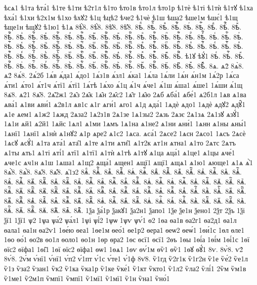 {ѣсѧ1
ѣ1та
ѣта́1
ѣ1те
ѣ1ти
ѣ2т1л
ѣ1то
ѣто1в
ѣто1л
ѣто1р
ѣ1тѐ
ѣ1ті
ѣ1тѝ
ѣ1тꙋ
ѣ1ха
ѣха́1
ѣ1хи
ѣ2х1м
ѣ1хо
ѣхꙋ2
ѣ1ц
ѣцѣ2
ѣче2
ѣ1чѐ
ѣ1ш
ѣша2
ѣше1м
ѣшє́1
ѣ1щ
ѣще1н
ѣщꙋ2
ѣ1ю1
ѣ1ѧ
8ѣ҆̀8.
8ѣ҆́8.
8ѣ҆̈8.
8ѣ҆̑8.
8ѣⷠ.
8ѣⷠ҇.
8ѣⷡ.
8ѣⷡ҇.
8ѣⷢ.
8ѣⷢ҇.
8ѣⷣ.
8ѣⷣ҇.
8ѣⷤ.
8ѣⷤ҇.
8ѣⷥ.
8ѣⷥ҇.
8ѣⷦ.
8ѣⷦ҇.
8ѣⷧ.
8ѣⷧ҇.
8ѣⷨ.
8ѣⷨ҇.
8ѣⷩ.
8ѣⷩ҇.
8ѣⷪ.
8ѣⷪ҇.
8ѣⷫ.
8ѣⷫ҇.
8ѣⷬ.
8ѣⷬ҇.
8ѣⷭ.
8ѣⷭ҇.
8ѣⷮ.
8ѣⷮ҇.
8ѣⷯ.
8ѣⷯ҇.
8ѣⷰ.
8ѣⷰ҇.
8ѣⷱ.
8ѣⷱ҇.
8ѣⷲ.
8ѣⷲ҇.
8ѣⷳ.
8ѣⷳ҇.
8ѣⷴ.
8ѣⷴ҇.
8ѣⷵ.
8ѣⷵ҇.
8ѣⷶ.
8ѣⷶ҇.
8ѣⷷ.
8ѣⷷ҇.
8ѣⷸ.
8ѣⷸ҇.
8ѣⷹ.
8ѣⷹ҇.
8ѣⷺ.
8ѣⷺ҇.
8ѣⷻ.
8ѣⷻ҇.
8ѣⷼ.
8ѣⷼ҇.
8ѣⷽ.
8ѣⷽ҇.
8ѣⷾ.
8ѣⷾ҇.
8ѣⷿ.
8ѣⷿ҇.
ѣ1ꙋ
ѣꙋ́1
8ѣꙴ.
8ѣꙴ҇.
8ѣꙵ.
8ѣꙵ҇.
8ѣꙶ.
8ѣꙶ҇.
8ѣꙷ.
8ѣꙷ҇.
8ѣꙸ.
8ѣꙸ҇.
8ѣꙹ.
8ѣꙹ҇.
8ѣꙺ.
8ѣꙺ҇.
8ѣꙻ.
8ѣꙻ҇.
8ѣ꙼.
8ѣ꙼҇.
8ѣ꙽.
8ѣ꙽҇.
8ѧ.
ѧ2̀
8ѧ̀8.
ѧ2́
8ѧ́8.
2ѧ́2б
1ѧ́в
ѧ́да1
ѧ́до1
1ѧ́з1в
ѧ́зл1
ѧ́ка1
1ѧ́ла
1ѧ́ли
1ѧ́н
ѧ́н1м
1ѧ́2р
1ѧ́са
ѧ́ти1
ѧ́то1
ѧ́т1ч
ѧ́тї1
ѧ́тї1
1ѧ́тѣ
1ѧ́хо
ѧ́1ц
ѧ́1ч
ѧ́че1
ѧ́1ш
ѧ́ша1
ѧ́ше1
1ѧ́ши
ѧ́1щ
8ѧ̈8.
ѧ2̑1
8ѧ̑8.
2ѧ̑2ж1
2ѧ̑з
2ѧ̑к
1ѧ̑н
2ѧ̑с2
1ѧ̑т
1ѧ̑ю
2ѧб
ѧба́1
ѧбе́1
ѧ2б1л
1ѧв
ѧ1ва
ѧва́1
ѧ1ви
ѧви́1
ѧ2в1л
ѧв1с
ѧ1г
ѧги́1
ѧго1
ѧ1д
ѧда́1
1ѧдѐ
ѧдо1
1ѧдѐ
ѧдꙋ2
ѧдꙋ̑1
ѧ1е
ѧем1
ѧ1ж2
1ѧжд
2ѧза2
1ѧ2з1в
2ѧ1зе
1ѧ1зы2
2ѧзь
2ѧзє
2ѧ1зѧ
2ѧ1зꙋ
ѧзꙋ́1
1ѧ1и
ѧй1
ѧ2й1
1ѧйс
1ѧл1
ѧ1ми
1ѧмъ
1ѧ1на
ѧ1не2
ѧ1ни
ѧни́1
1ѧнн
ѧ1ны
ѧны́1
1ѧнї1
1ѧнї1
ѧ1нѝ
ѧ1нꙋ2
ѧ1р
ѧре2
ѧ1с2
1ѧса.
ѧса́1
2ѧсе2
1ѧсн
2ѧсо1
1ѧсъ
2ѧсѐ
1ѧсꙋ
ѧсꙋ́1
ѧ1та
ѧта́1
ѧта̑1
ѧ1те
ѧ1ти
ѧти̑1
ѧ1т2к
ѧт1н
ѧтна1
ѧ1то
2ѧтс
2ѧтъ
ѧ1ты
ѧть1
ѧ1ті
ѧті́1
ѧтї1
ѧ1тї1
ѧ1тѝ
ѧ1тѣ
ѧ1тꙋ
ѧ1ца
ѧца́1
ѧ1це1
ѧ1цы
ѧче́1
ѧче1с
ѧч1н
ѧ1ш
1ѧша1
ѧ1щ2
ѧща́1
ѧщен1
ѧщї1
ѧщї1
ѧщѧ1
ѧ1ю1
ѧюще1
ѧ1ѧ
ѧ҆̀1
8ѧ҆̀8.
8ѧ҆́8.
8ѧ҆̈8.
8ѧ҆̑8.
ѧ҆1з2
8ѧⷠ.
8ѧⷠ҇.
8ѧⷡ.
8ѧⷡ҇.
8ѧⷢ.
8ѧⷢ҇.
8ѧⷣ.
8ѧⷣ҇.
8ѧⷤ.
8ѧⷤ҇.
8ѧⷥ.
8ѧⷥ҇.
8ѧⷦ.
8ѧⷦ҇.
8ѧⷧ.
8ѧⷧ҇.
8ѧⷨ.
8ѧⷨ҇.
8ѧⷩ.
8ѧⷩ҇.
8ѧⷪ.
8ѧⷪ҇.
8ѧⷫ.
8ѧⷫ҇.
8ѧⷬ.
8ѧⷬ҇.
8ѧⷭ.
8ѧⷭ҇.
8ѧⷮ.
8ѧⷮ҇.
8ѧⷯ.
8ѧⷯ҇.
8ѧⷰ.
8ѧⷰ҇.
8ѧⷱ.
8ѧⷱ҇.
8ѧⷲ.
8ѧⷲ҇.
8ѧⷳ.
8ѧⷳ҇.
8ѧⷴ.
8ѧⷴ҇.
8ѧⷵ.
8ѧⷵ҇.
8ѧⷶ.
8ѧⷶ҇.
8ѧⷷ.
8ѧⷷ҇.
8ѧⷸ.
8ѧⷸ҇.
8ѧⷹ.
8ѧⷹ҇.
8ѧⷺ.
8ѧⷺ҇.
8ѧⷻ.
8ѧⷻ҇.
8ѧⷼ.
8ѧⷼ҇.
8ѧⷽ.
8ѧⷽ҇.
8ѧⷾ.
8ѧⷾ҇.
8ѧⷿ.
8ѧⷿ҇.
8ѧꙴ.
8ѧꙴ҇.
8ѧꙵ.
8ѧꙵ҇.
8ѧꙶ.
8ѧꙶ҇.
8ѧꙷ.
8ѧꙷ҇.
8ѧꙸ.
8ѧꙸ҇.
8ѧꙹ.
8ѧꙹ҇.
8ѧꙺ.
8ѧꙺ҇.
8ѧꙻ.
8ѧꙻ҇.
8ѧ꙼.
8ѧ꙼҇.
8ѧ꙽.
8ѧ꙽҇.
1ѯа
ѯа́1р
ѯакꙋ1
ѯа2н1
ѯапо1
1ѯе
ѯе1н
ѯено1
2ѯт
2ѯъ
1ѯі
ѯї1
1ѯї1
ѱ2
1ѱа
ѱа́2
ѱа́л1
1ѱі
ѱі́2
1ѱѡ
1ѱѵ
ѱѵ́1
ѳ2
1ѳа
ѳа1в
ѳа2г1
ѳа2д1
ѳа1л
ѳала1
ѳа1н
ѳа2ѵ1
1ѳе́ю
ѳеа1
1ѳе1м
ѳео́1
ѳе1р2
ѳера1
ѳеѡ2
ѳеѡ́1
1ѳи́1с
1ѳл
ѳле1
1ѳо
ѳо́1
ѳо2в
ѳо1л
ѳоло1
ѳо1н
1ѳр
ѳра2
1ѳс
ѳсї1
ѳсї1
2ѳъ
1ѳы
1ѳі́а
1ѳі́м
1ѳі́1с
1ѳї
ѳїс2
ѳїфа1
1ѳі̑1
1ѳї
ѳїс2
ѳїфа1
ѳѡ1
1ѳѧ1
1ѳѵ
ѳѵ́1м
ѳѷ1
ѳѷ1
1ѳꙋ
ѳꙋ́1
8ѵ.
8ѵ̀8.
ѵ2́
8ѵ́8.
2ѵ́м
ѵ́нї1
ѵ́нї1
ѵ́п2
ѵ́1пт
ѵ́1с
ѵ́те1
ѵ́1ф
8ѵ̈8.
ѷ1гд
ѷ2г1к
ѷ1г2н
ѷ1е
ѷе́2
ѷе1л
ѷ1з
ѷза2
ѷзан1
ѷк2
ѷ1ка
ѷка1р
ѷ1ке
ѷке́1
ѷ1кт
ѷкто1
ѷ1л2
ѷла2
ѷлі́1
2ѷм
ѷм1в
ѷ1ме1
ѷ2м1п
ѷмпї1
ѷмпї1
ѷ1мї1
ѷ1мї1
ѷ1н
ѷна1
ѷно́1
}
